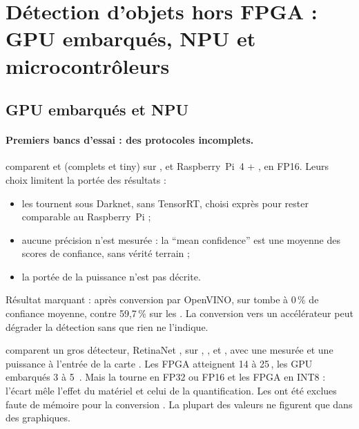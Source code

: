 \section{Détection d'objets hors FPGA : GPU embarqués, NPU et microcontrôleurs}
\label{sec:detection-autres}

\subsection{GPU embarqués et NPU}

\paragraph{Premiers bancs d'essai : des protocoles incomplets.}
\citet{2022-feng-benchmark-analysis-yolo-performance-edge} comparent  et 
(complets et tiny) sur ,  et Raspberry~Pi~4 + , en FP16. Leurs choix
limitent la portée des résultats :
\begin{itemize}
  \item les  tournent sous Darknet, sans TensorRT, choisi exprès pour rester
    comparable au Raspberry~Pi  ;
  \item aucune précision n'est mesurée : la \enquote{mean confidence} est une moyenne des
    scores de confiance, sans vérité terrain  ;
  \item la portée de la puissance n'est pas décrite.
\end{itemize}
Résultat marquant : après conversion par OpenVINO,  sur  tombe à 0\,\% de
confiance moyenne, contre 59,7\,\% sur les  . La conversion vers un
accélérateur peut dégrader la détection sans que rien ne l'indique.

\citet{arxiv-2211.11647-benchmarking-edge-computing-devices-grape} comparent un gros
détecteur, RetinaNet , sur ,  ,  et , avec une
 mesurée et une puissance à l'entrée de la carte . Les FPGA atteignent 14 à
25\,, les GPU embarqués 3 à 5\, . Mais la  tourne en FP32 ou FP16
et les FPGA en INT8 : l'écart mêle l'effet du matériel et celui de la quantification. Les
 ont été exclues faute de mémoire pour la conversion . La plupart des
valeurs ne figurent que dans des graphiques.

